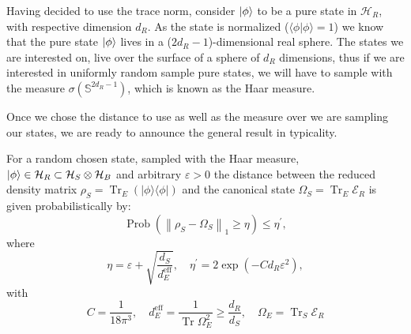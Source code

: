 \indent Having decided to use the trace norm, consider $\mathinner{|{\phi}\rangle}$ to be a pure state in $\mathcal{H}_R$, with respective dimension $d_R$. As the state is normalized ($\langle\phi | \phi\rangle=1$) we know that the pure state $\mathinner{|{\phi}\rangle}$ lives in a ($2d_R-1$)-dimensional real sphere. The states we are interested on, live over the surface of a sphere of $d_R$ dimensions, thus if we are interested in uniformly random sample pure states, we will have to sample with the measure $\sigma(\mathbb{S}^{2d_R-1})$, which is known as the Haar measure.
 

\indent Once we chose the distance to use as well as the measure over we are sampling our states, we are ready to announce the general result in typicality.\\
\begin{theorem}
For a random chosen state, sampled with the Haar measure, $\mathinner{|{\phi}\rangle}\in\mathcal{H}_R\subset\mathcal{H}_S\otimes\mathcal{H}_B$ and arbitrary $\varepsilon >0$ the distance between the reduced density matrix $\rho_{S}=\operatorname{Tr}_{E}(|\phi\rangle\langle\phi|)$ and the canonical state $\Omega_S=\operatorname{Tr}_E\mathcal{E}_R$ is given probabilistically by:
\begin{equation}
\operatorname{Prob}\left(\left\|\rho_{S}-\Omega_{S}\right\|_{1} \geq \eta\right) \leq \eta^{\prime},
\label{CH1:Typicality_result_1}
\end{equation}
where
\begin{equation}
\eta=\varepsilon+\sqrt{\frac{d_{S}}{d_{E}^{\mathrm{eff}}}}, \quad \eta^{\prime}=2 \exp \left(-C d_{R} \varepsilon^{2}\right),
\label{CH1:Typicality_result_1_1}
\end{equation}
with
\begin{equation}
C=\frac{1}{18 \pi^{3}}, \quad d_{E}^{\mathrm{eff}}=\frac{1}{\operatorname{Tr} \Omega_{E}^{2}}\geq \frac{d_R}{d_S}, \quad \Omega_{E}=\operatorname{Tr}_{S} \mathcal{E}_{R}
\label{CH1:Typicality_result_1_2}
\end{equation}
\end{theorem}

